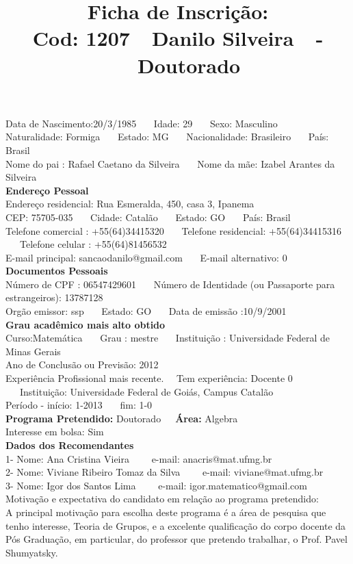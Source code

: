 \documentclass[11pt]{article}
\title{\vspace*{-4cm} Ficha de Inscrição: \\Cod: 1207\ \ Danilo  Silveira\ \ - \ \ Doutorado 
 }
\date{}
\begin{document}
\maketitle
\vspace*{-1.5cm}
\noindent Data de Nascimento:20/3/1985
\ \ \ Idade: 29   \ \ \ Sexo: Masculino
\\
Naturalidade: Formiga  
\ \ \  Estado: MG
\ \ \  Nacionalidade: Brasileiro
\ \ \ País: Brasil
\\        
Nome do pai : Rafael Caetano da Silveira
\ \ \ Nome da mãe: Izabel Arantes da Silveira          
\\[0.2cm]                     
\textbf{Endereço Pessoal} 
\\ 
\noindent Endereço residencial: Rua Esmeralda, 450, casa 3,  Ipanema
\\
        CEP: 75705-035 
\ \ \ Cidade: Catalão 
\ \ \ Estado: GO 
\ \ \ País: Brasil
\\		
		Telefone comercial : +55(64)34415320
\ \ \ Telefone residencial: +55(64)34415316
\ \ \ Telefone celular : +55(64)81456532
\\
E-mail principal: sancaodanilo@gmail.com
\ \ \ E-mail alternativo: 0 
\\[0.2cm] 
\textbf{Documentos Pessoais}
\\
\noindent Número de CPF : 06547429601
\ \ \ Número de Identidade (ou Passaporte para estrangeiros): 13787128
\\
Orgão emissor: ssp
\ \ \ Estado: GO
\ \ \ Data de emissão :10/9/2001
\\[0.3cm]
\textbf{Grau acadêmico mais alto obtido}
\\	
Curso:Matemática
\ \ \ Grau : mestre
\ \ \ Instituição : Universidade Federal de Minas Gerais
\\			
Ano de Conclusão ou Previsão: 2012
\\ 
Experiência Profissional mais recente. \ \  
Tem experiência: Docente 0  
\ \ \ Instituição: Universidade Federal de Goiás, Campus Catalão
\\  
Período - início: 1-2013
\ \ \ fim: 1-0
\\[0.2cm] 
\textbf{Programa Pretendido:} Doutorado\ \ \ \textbf{Área:} Algebra\\
Interesse em bolsa: Sim
\\[0.3cm]		
\textbf{Dados dos Recomendantes} 
\\
1- Nome: Ana Cristina Vieira
\ \ \ \  e-mail: anacris@mat.ufmg.br 
\\
2- Nome: Viviane Ribeiro Tomaz da Silva
\ \ \ \ e-mail: viviane@mat.ufmg.br
\\
3- Nome: Igor dos Santos Lima
\ \ \ \ e-mail: igor.matematico@gmail.com
\\[0.2cm]
Motivação e expectativa do candidato em relação ao programa pretendido:
\\A principal motivação para escolha deste programa é a área de pesquisa que tenho interesse, Teoria de Grupos, e a excelente qualificação do corpo docente da Pós Graduação, em particular, do professor que pretendo trabalhar, o Prof. Pavel Shumyatsky. 
\end{document}
